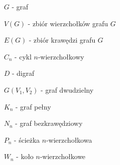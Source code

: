 $G$ - graf

$V(G)$ - zbiór wierzchołków grafu $G$

$E(G)$ - zbiór krawędzi grafu $G$

$C_n$ - cykl $n$-wierzchołkowy

$D$ - digraf

$G(V_1, V_2)$ - graf dwudzielny

$K_n$ - graf pełny

$N_n$ - graf bezkrawędziowy

$P_n$ - ścieżka $n$-wierzchołkowa

$W_n$ - koło $n$-wierzchołkowe